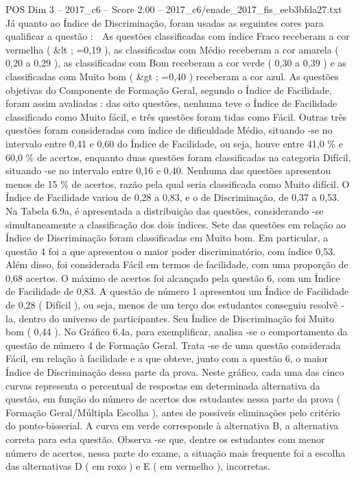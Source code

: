 \begin{textsample}{POS Dim 3 – 2017\_c6 – Score 2.00 – 2017\_c6/enade\_2017\_fis\_eeb3bfda27.txt}
Já quanto ao Índice de Discriminação, foram usadas as seguintes cores para qualificar a questão :  As questões classificadas com índice Fraco receberam a cor vermelha ( \&lt ; =0,19 ), as classificadas com Médio receberam a cor amarela ( 0,20 a 0,29 ), as classificadas com Bom receberam a cor verde ( 0,30 a 0,39 ) e as classificadas com Muito bom ( \&gt ; =0,40 ) receberam a cor azul.
As questões objetivas do Componente de Formação Geral, segundo o Índice de Facilidade, foram assim avaliadas : das oito questões, nenhuma teve o Índice de Facilidade classificado como Muito fácil, e três questões foram tidas como Fácil.
Outras três questões foram consideradas com índice de dificuldade Médio, situando -se no intervalo entre 0,41 e 0,60 do Índice de Facilidade, ou seja, houve entre 41,0 \% e 60,0 \% de acertos, enquanto duas questões foram classificadas na categoria Difícil, situando -se no intervalo entre 0,16 e 0,40.
Nenhuma das questões apresentou menos de 15 \% de acertos, razão pela qual seria classificada como Muito difícil.
O Índice de Facilidade variou de 0,28 a 0,83, e o de Discriminação, de 0,37 a 0,53.
Na Tabela 6.9a, é apresentada a distribuição das questões, considerando -se simultaneamente a classificação dos dois índices.
Sete das questões em relação ao Índice de Discriminação foram classificadas em Muito bom.
Em particular, a questão 4 foi a que apresentou o maior poder discriminatório, com índice 0,53.
Além disso, foi considerada Fácil em termos de facilidade, com uma proporção de 0,68 acertos.
O máximo de acertos foi alcançado pela questão 6, com um Índice de Facilidade de 0,83.
A questão de número 1 apresentou um Índice de Facilidade de 0,28 ( Difícil ), ou seja, menos de um terço dos estudantes conseguiu resolvê -la, dentro do universo de participantes.
Seu Índice de Discriminação foi Muito bom ( 0,44 ).
No Gráfico 6.4a, para exemplificar, analisa -se o comportamento da questão de número 4 de Formação Geral.
Trata -se de uma questão considerada Fácil, em relação à facilidade e a que obteve, junto com a questão 6, o maior Índice de Discriminação dessa parte da prova.
Neste gráfico, cada uma das cinco curvas representa o percentual de respostas em determinada alternativa da questão, em função do número de acertos dos estudantes nessa parte da prova ( Formação Geral/Múltipla Escolha ), antes de possíveis eliminações pelo critério do ponto-bisserial.
A curva em verde corresponde à alternativa B, a alternativa correta para esta questão.
Observa -se que, dentre os estudantes com menor número de acertos, nessa parte do exame, a situação mais frequente foi a escolha das alternativas D ( em roxo ) e E ( em vermelho ), incorretas.

\end{textsample}
